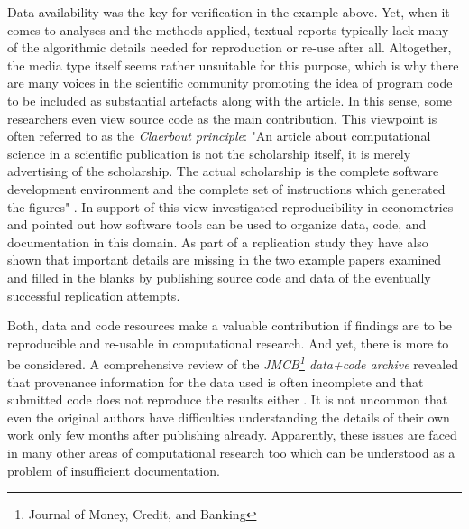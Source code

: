 \documentclass{sig-alternate}
\begin{document}
Data availability was the key for verification in the example above.
Yet, when it comes to analyses and the methods applied, textual reports typically lack many of the algorithmic details needed for reproduction or re-use after all.
Altogether, the media type itself seems rather unsuitable for this purpose, which is why there are many voices in the scientific community promoting the idea of program code to be included as substantial artefacts along with the article.
In this sense, some researchers even view source code as the main contribution.
This viewpoint is often referred to as the \textit{Claerbout principle}:
"An article about computational science in a scientific publication is not the scholarship itself, it is merely advertising of  the scholarship. The actual scholarship is the complete software development environment and the complete set of instructions which generated the figures" \cite{Buckheit1995b} \cite{de2001reproducible}.
In support of this view \cite{KoenkerZeileis2009} investigated reproducibility in econometrics and pointed out how software tools can be used to organize data, code, and documentation in this domain.
As part of a replication study they have also shown that important details are missing in the two example papers examined and filled in the blanks by publishing source code and data of the eventually successful replication attempts.

Both, data and code resources make a valuable contribution if findings are to be reproducible and re-usable in computational research.
And yet, there is more to be considered.
A comprehensive review of the \textit{JMCB\footnote{Journal of Money, Credit, and Banking} data+code archive} revealed that provenance information for the data used is often incomplete and that submitted code does not reproduce the results either \cite{RePEc_ejw_journl_v_4_y_2007_i_3_p_326_337}.
It is not uncommon that even the original authors have difficulties understanding the details of their own work only few months after publishing already.
Apparently, these issues are faced in many other areas of computational research too
\cite{hothorn2011case}
\cite{gonzalez2012reproducibility}
\cite{vandewalle2009reproducible}
\cite{cassey2006reproducibility}
which can be understood as a problem of insufficient documentation.
\end{document}
